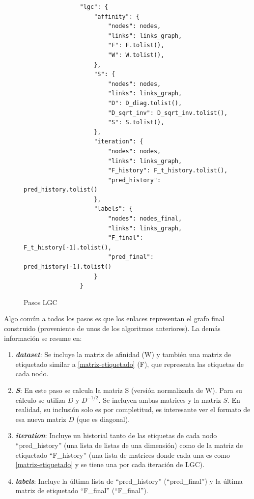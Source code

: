 \begin{figure}[h!]
    \centering
    \begin{minipage}{0.9\linewidth}
        \begin{center}
            \begin{lstlisting}
                "lgc": {
                    "affinity": {
                        "nodes": nodes,
                        "links": links_graph,
                        "F": F.tolist(),
                        "W": W.tolist(),
                    },
                    "S": {
                        "nodes": nodes,
                        "links": links_graph,
                        "D": D_diag.tolist(),
                        "D_sqrt_inv": D_sqrt_inv.tolist(),
                        "S": S.tolist(),
                    },
                    "iteration": {
                        "nodes": nodes,
                        "links": links_graph,
                        "F_history": F_t_history.tolist(),
                        "pred_history": pred_history.tolist()
                    },
                    "labels": {
                        "nodes": nodes_final,
                        "links": links_graph,
                        "F_final": F_t_history[-1].tolist(),
                        "pred_final": pred_history[-1].tolist()
                    }
                }
            \end{lstlisting}
        \end{center}
    \end{minipage}
    \caption{Pasos LGC}
    \label{fig:pasos-lgc}
\end{figure}

Algo común a todos los pasos es que los enlaces representan el grafo final construido (proveniente de unos de los algoritmos anteriores). La demás información se resume en:
\begin{enumerate}
    \item \textit{\textbf{dataset}}: Se incluye la matriz de afinidad (W) y también una matriz de etiquetado similar a \ref{matriz-etiquetado} (F), que representa las etiquetas de cada nodo.
    \item \textit{\textbf{S}}: En este paso se calcula la matriz S (versión normalizada de W). Para su cálculo se utiliza $D$ y $D^{-1/2}$. Se incluyen ambas matrices y la matriz $S$. En realidad, su inclusión solo es por completitud, es interesante ver el formato de esa nueva matriz $D$ (que es diagonal).
    \item \textit{\textbf{iteration}}: Incluye un historial tanto de las etiquetas de cada nodo ``pred\_history'' (una lista de listas de una dimensión) como de la matriz de etiquetado ``F\_history'' (una lista de matrices donde cada una es como \ref{matriz-etiquetado} y se tiene una por cada iteración de LGC).
    \item \textit{\textbf{labels}}: Incluye la última lista de ``pred\_history'' (``pred\_final'') y la última matriz de etiquetado ``F\_final'' (``F\_final'').
\end{enumerate}